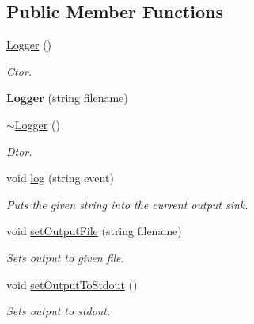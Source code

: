 \subsection*{Public Member Functions}
\begin{DoxyCompactItemize}
\item 
\hypertarget{classLogger_abc41bfb031d896170c7675fa96a6b30c}{\hyperlink{classLogger_abc41bfb031d896170c7675fa96a6b30c}{Logger} ()}\label{classLogger_abc41bfb031d896170c7675fa96a6b30c}

\begin{DoxyCompactList}\small\item\em Ctor. \end{DoxyCompactList}\item 
\hypertarget{classLogger_a08ccb1b46d6ffef44052d289ecb4b04b}{{\bfseries Logger} (string filename)}\label{classLogger_a08ccb1b46d6ffef44052d289ecb4b04b}

\item 
\hypertarget{classLogger_acb668a9e186a25fbaad2e4af6d1ed00a}{\hyperlink{classLogger_acb668a9e186a25fbaad2e4af6d1ed00a}{$\sim$\-Logger} ()}\label{classLogger_acb668a9e186a25fbaad2e4af6d1ed00a}

\begin{DoxyCompactList}\small\item\em Dtor. \end{DoxyCompactList}\item 
\hypertarget{classLogger_ae196a7ed5b5cda692781605cb0dc27c8}{void \hyperlink{classLogger_ae196a7ed5b5cda692781605cb0dc27c8}{log} (string event)}\label{classLogger_ae196a7ed5b5cda692781605cb0dc27c8}

\begin{DoxyCompactList}\small\item\em Puts the given string into the current output sink. \end{DoxyCompactList}\item 
\hypertarget{classLogger_a83ea19df840d8890a7f138ece39ce4e5}{void \hyperlink{classLogger_a83ea19df840d8890a7f138ece39ce4e5}{set\-Output\-File} (string filename)}\label{classLogger_a83ea19df840d8890a7f138ece39ce4e5}

\begin{DoxyCompactList}\small\item\em Sets output to given file. \end{DoxyCompactList}\item 
\hypertarget{classLogger_a8db2443ab62009c3e5784ea7e4a9c8c4}{void \hyperlink{classLogger_a8db2443ab62009c3e5784ea7e4a9c8c4}{set\-Output\-To\-Stdout} ()}\label{classLogger_a8db2443ab62009c3e5784ea7e4a9c8c4}

\begin{DoxyCompactList}\small\item\em Sets output to stdout. \end{DoxyCompactList}\end{DoxyCompactItemize}
